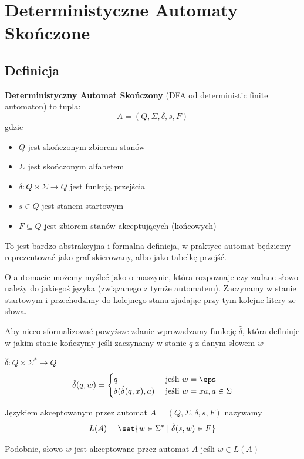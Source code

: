 \section{Deterministyczne Automaty Skończone}
\subsection{Definicja}
\begin{definition}
    \textbf{Deterministyczny Automat Skończony} (DFA od deterministic finite automaton) to tupla:
    \[
        A = (Q, \Sigma, \delta, s, F)
    \]
    gdzie
    \begin{itemize}
        \item \( Q \) jest skończonym zbiorem stanów
        \item \( \Sigma \) jest skończonym alfabetem
        \item \( \delta: Q \times \Sigma \rightarrow Q \) jest funkcją przejścia
        \item \( s \in Q \) jest stanem startowym
        \item \( F \subseteq Q \) jest zbiorem stanów akceptujących (końcowych)
    \end{itemize}
\end{definition}

To jest bardzo abstrakcyjna i formalna definicja, w praktyce automat będziemy reprezentować jako graf skierowany, albo jako tabelkę przejść.

O automacie możemy myśleć jako o maszynie, która rozpoznaje czy zadane słowo należy do jakiegoś języka (związanego z tymże automatem). Zaczynamy w stanie startowym i przechodzimy do kolejnego stanu zjadając przy tym kolejne litery ze słowa.

Aby nieco sformalizować powyższe zdanie wprowadzamy funkcję \( \hat \delta \), która definiuje w jakim stanie kończymy jeśli zaczynamy w stanie \( q \) z danym słowem \( w \)
\begin{definition}
\( \hat \delta : Q \times \Sigma^* \rightarrow Q \)
\[
    \hat \delta(q, w) = \begin{cases}
    q & \text{ jeśli } w = \eps \\
    \delta(\hat \delta(q, x), a) & \text{ jeśli } w = xa, a \in \Sigma \\
    \end{cases}
\]
\end{definition}

\begin{definition}
    Językiem akceptowanym przez automat \( A = (Q, \Sigma, \delta, s, F) \) nazywamy
    \[
        L(A) = \set{w \in \Sigma^* \mid \hat \delta(s, w) \in F}
    \]
    
    Podobnie, słowo \( w \) jest akceptowane przez automat \( A \) jeśli \( w \in L(A) \)
\end{definition}


